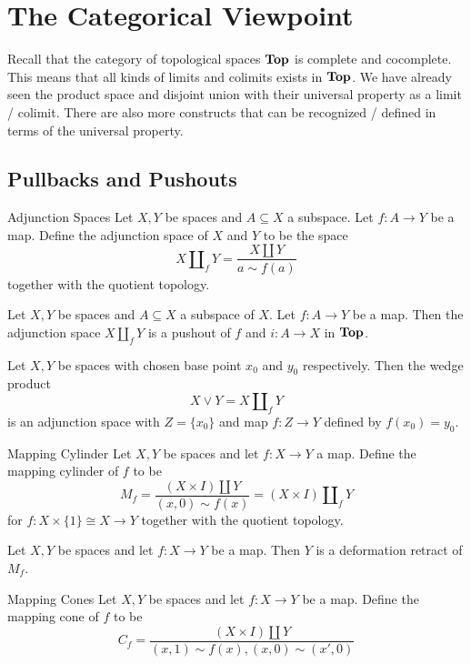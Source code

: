 \documentclass[a4paper]{article}
\begin{document}
\pagebreak
\section{The Categorical Viewpoint}
Recall that the category of topological spaces $\bold{Top}$ is complete and cocomplete. This means that all kinds of limits and colimits exists in $\bold{Top}$. We have already seen the product space and disjoint union with their universal property as a limit / colimit. There are also more constructs that can be recognized / defined in terms of the universal property. 

\subsection{Pullbacks and Pushouts}
\begin{defn}{Adjunction Spaces}{} Let $X,Y$ be spaces and $A\subseteq X$ a subspace. Let $f:A\to Y$ be a map. Define the adjunction space of $X$ and $Y$ to be  the space $$X\amalg_fY=\frac{X\amalg Y}{a\sim f(a)}$$ together with the quotient topology. 
\end{defn}

\begin{prp}{}{} Let $X,Y$ be spaces and $A\subseteq X$ a subspace of $X$. Let $f:A\to Y$ be a map. Then the adjunction space $X\amalg_f Y$ is a pushout of $f$ and $i:A\to X$ in $\bold{Top}$. 
\end{prp}

\begin{prp}{}{} Let $X,Y$ be spaces with chosen base point $x_0$ and $y_0$ respectively. Then the wedge product $$X\vee Y=X\amalg_fY$$ is an adjunction space with $Z=\{x_0\}$ and map $f:Z\to Y$ defined by $f(x_0)=y_0$. 
\end{prp}

\begin{defn}{Mapping Cylinder}{} Let $X,Y$ be spaces and let $f:X\to Y$ a map. Define the mapping cylinder of $f$ to be $$M_f=\frac{(X\times I)\amalg Y}{(x,0)\sim f(x)}=(X\times I)\amalg_fY$$ for $f:X\times\{1\}\cong X\to Y$ together with the quotient topology. 
\end{defn}

\begin{lmm}{}{} Let $X,Y$ be spaces and let $f:X\to Y$ be a map. Then $Y$ is a deformation retract of $M_f$. 
\end{lmm}

\begin{defn}{Mapping Cones}{} Let $X,Y$ be spaces and let $f:X\to Y$ be a map. Define the mapping cone of $f$ to be $$C_f=\frac{(X\times I)\amalg Y}{(x,1)\sim f(x),(x,0)\sim(x',0)}$$
\end{defn}
\end{document}
